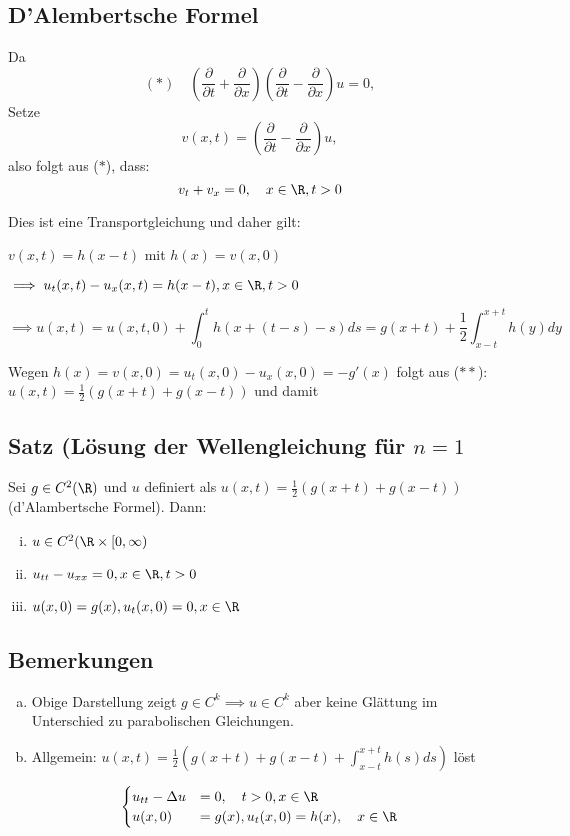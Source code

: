 \subsection{D'Alembertsche Formel}

Da
$$
(\ast) \quad \left(\frac{\partial}{\partial t} + \frac{\partial}{\partial x}\right)\left(\frac{\partial}{\partial t} - \frac{\partial}{\partial x}\right) u = 0,
$$
Setze
$$
v(x,t) = \left(\frac{\partial }{\partial t} - \frac{\partial}{\partial x}\right) u,
$$
also folgt aus ($\ast$), dass:
$$
v_t + v_x = 0, \quad x \in \R, t > 0
$$

Dies ist eine Transportgleichung und daher gilt:

$v(x,t) = h(x - t)$ mit $h(x) = v(x,0)$

$\implies u_t(x,t) - u_x(x,t) = h(x - t), x \in \R, t > 0$

\begin{displaymath}
  \implies u(x,t) = u(x, t, 0) + \int_0^t h(x + (t - s) - s) ds = g(x + t) + \frac{1}{2} \int_{x - t}^{x + t} h(y) dy \tag{$\ast\ast$}
\end{displaymath}

Wegen $h(x) = v(x, 0) = u_t(x, 0) - u_x(x, 0) = -g'(x)$ folgt aus ($\ast\ast$): $u(x, t) = \frac{1}{2}(g(x + t) + g(x - t))$ und damit

\subsection{Satz (Lösung der Wellengleichung für $n = 1$}

Sei $g \in C^2(\R)$ und $u$ definiert als $u(x,t) = \frac{1}{2}(g(x + t) + g(x - t))$ (d'Alambertsche Formel). Dann:
\begin{enumerate}[(i)]
  \item $u \in C^2(\R \times [0, \infty)$
  \item $u_{tt} - u_{xx} = 0, x \in \R, t > 0$
  \item $u(x,0) = g(x) , u_t(x, 0) = 0, x \in \R$
\end{enumerate}

\subsection{Bemerkungen}

\begin{enumerate}[a)]
\item Obige Darstellung zeigt $g \in C^k \implies u \in C^k$ aber keine Glättung im Unterschied zu parabolischen Gleichungen.
\item Allgemein: $u(x, t) = \frac{1}{2} (g(x + t) + g(x - t) + \int_{x - t}^{x + t} h(s) ds)$ löst
\end{enumerate}
$$
\begin{cases}
u_{tt} - \Delta u &= 0, \quad t > 0, x \in \R \\
u(x,0) &= g(x), u_t(x,0) = h(x), \quad x \in \R
\end{cases}
$$

